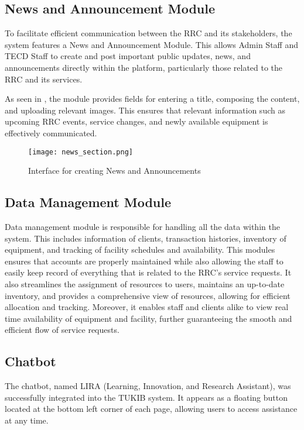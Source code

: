 \subsection{News and Announcement Module}

To facilitate efficient communication between the RRC and its stakeholders, the system features a News and Announcement Module. This allows Admin Staff and TECD Staff to create and post important public updates, news, and announcements directly within the platform, particularly those related to the RRC and its services.

As seen in , the module provides fields for entering a title, composing the content, and uploading relevant images. This ensures that relevant information such as upcoming RRC events, service changes, and newly available equipment is effectively communicated.

\begin{figure}[h]
    \centering
    \texttt{[image: news\_section.png]}
    \caption{Interface for creating News and Announcements}
    \label{fig:announcements}
\end{figure}

\newpage

\subsection{Data Management Module}

Data management module is responsible for handling all the data within the system. This includes information of clients, transaction histories, inventory of equipment, and tracking of facility schedules and availability. This modules ensures that accounts are properly maintained while also allowing the staff to easily keep record of everything that is related to the RRC's service requests. It also streamlines the assignment of resources to users, maintains an up-to-date inventory, and provides a comprehensive view of resources, allowing for efficient allocation and tracking. Moreover, it enables staff and clients alike to view real time availability of equipment and facility, further guaranteeing the smooth and efficient flow of  service requests.

\subsection{Chatbot}

The chatbot, named LIRA (Learning, Innovation, and Research Assistant), was successfully integrated into the TUKIB system. It appears as a floating button located at the bottom left corner of each page, allowing users to access assistance at any time.

